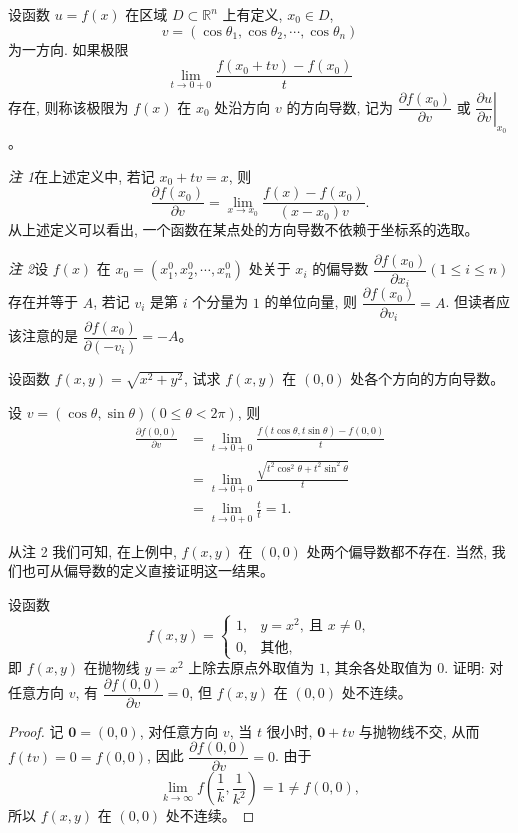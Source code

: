 \documentclass[UTF8,12pt,a4paper,fontset=fandol]{ctexart}
\begin{document}
\begin{definition}\label{course-definition-14-1-2}\quad 设函数 $u=f(x)$ 在区域 $D\subset\mathbb R^n$ 上有定义, $x_0\in D$,
\[
  v=(\cos\theta_1,\cos\theta_2,\cdots,\cos\theta_n)
\]
为一方向. 如果极限
\[
  \lim_{t\to0+0}\frac{f(x_0+tv)-f(x_0)}{t}
\]
存在, 则称该极限为 $f(x)$ 在 $x_0$ 处沿方向 $v$ 的方向导数, 记为 $\dfrac{\partial f(x_0)}{\partial v}$ 或 $\left.\dfrac{\partial u}{\partial v}\right|_{x_0}$。

\end{definition}
\noindent\emph{注 1}\quad 在上述定义中, 若记 $x_0+tv=x$, 则
\[
  \frac{\partial f(x_0)}{\partial v}
  =\lim_{x\to x_0}\frac{f(x)-f(x_0)}{(x-x_0)v}.
\]
从上述定义可以看出, 一个函数在某点处的方向导数不依赖于坐标系的选取。

\noindent\emph{注 2}\quad 设 $f(x)$ 在 $x_0=(x_1^0,x_2^0,\cdots,x_n^0)$ 处关于 $x_i$ 的偏导数 $\dfrac{\partial f(x_0)}{\partial x_i}(1\leqslant i\leqslant n)$ 存在并等于 $A$, 若记 $v_i$ 是第 $i$ 个分量为 $1$ 的单位向量, 则 $\dfrac{\partial f(x_0)}{\partial v_i}=A$. 但读者应该注意的是 $\dfrac{\partial f(x_0)}{\partial(-v_i)}=-A$。

\begin{example}\label{course-example-14-1-3}\quad 设函数 $f(x,y)=\sqrt{x^2+y^2}$, 试求 $f(x,y)$ 在 $(0,0)$ 处各个方向的方向导数。

\end{example}
\begin{solve}\quad 设 $v=(\cos\theta,\sin\theta)(0\leqslant\theta<2\pi)$, 则
\[
\begin{aligned}
  \frac{\partial f(0,0)}{\partial v}
  &=\lim_{t\to0+0}
  \frac{f(t\cos\theta,t\sin\theta)-f(0,0)}{t}\\
  &=\lim_{t\to0+0}
  \frac{\sqrt{t^2\cos^2\theta+t^2\sin^2\theta}}{t}\\
  &=\lim_{t\to0+0}\frac{t}{t}=1.
\end{aligned}
\]

从注 2 我们可知, 在上例中, $f(x,y)$ 在 $(0,0)$ 处两个偏导数都不存在. 当然, 我们也可从偏导数的定义直接证明这一结果。

\end{solve}
\begin{example}\label{course-example-14-1-4}\quad 设函数
\[
  f(x,y)=
  \begin{cases}
    1, & y=x^2,\ \text{且 } x\ne0,\\
    0, & \text{其他},
  \end{cases}
\]
即 $f(x,y)$ 在抛物线 $y=x^2$ 上除去原点外取值为 $1$, 其余各处取值为 $0$. 证明: 对任意方向 $v$, 有 $\dfrac{\partial f(0,0)}{\partial v}=0$, 但 $f(x,y)$ 在 $(0,0)$ 处不连续。

\end{example}
\begin{proof}\quad 记 $\mathbf 0=(0,0)$, 对任意方向 $v$, 当 $t$ 很小时, $\mathbf 0+tv$ 与抛物线不交, 从而 $f(tv)=0=f(0,0)$, 因此 $\dfrac{\partial f(0,0)}{\partial v}=0$. 由于
\[
  \lim_{k\to\infty}f\left(\frac1k,\frac1{k^2}\right)=1\ne f(0,0),
\]
所以 $f(x,y)$ 在 $(0,0)$ 处不连续。

\end{proof}
\end{document}
